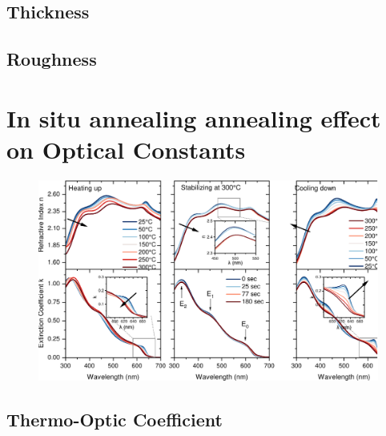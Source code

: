 \subsection{Thickness}
\subsection{Roughness}
\section{In situ annealing annealing effect on Optical Constants}

\begin{figure}
  \centering
  \medskip
  \includegraphics[width=.99\textwidth]{chapters/ellipsometry/image/Optical_constants.pdf}
  \caption{}
  \label{fig:ellipsometry:optical_constants}
\end{figure}


\subsection{Thermo-Optic Coefficient}

